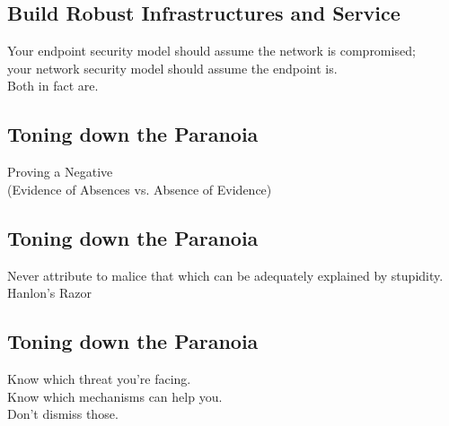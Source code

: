 \documentclass[xga]{xdvislides}
\begin{document}
\subsection{Build Robust Infrastructures and Service}
\vspace*{\fill}
\Huge
\begin{center}
	Your endpoint security model should assume the
	network is compromised; \\
	your network security model should assume the
	endpoint is. \\
\addvspace{.5in}
	Both in fact are.
\end{center}
\Normalsize
\vspace*{\fill}

\subsection{Toning down the Paranoia}
\vspace*{\fill}
\begin{center}
    \Hugesize
        Proving a Negative \\
	\vspace{.25in}
	\Normalsize
	(Evidence of Absences vs. Absence of Evidence)
\end{center}
\vspace*{\fill}


\subsection{Toning down the Paranoia}
\vspace*{\fill}
\Huge
\begin{center}
Never attribute to malice that which can be adequately explained by stupidity. \\
\vspace{.25in}
\Normalsize
Hanlon's Razor
\end{center}
\Normalsize
\vspace*{\fill}

\subsection{Toning down the Paranoia}
\vspace*{\fill}
\Huge
\begin{center}
Know which threat you're facing. \\
\vspace{.25in}
Know which mechanisms can help you. \\
Don't dismiss those.
\end{center}
\Normalsize
\vspace*{\fill}
\end{document}
